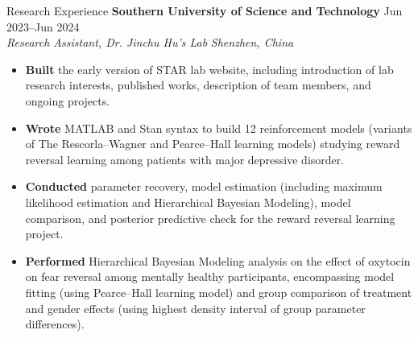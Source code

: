 \documentclass{resume} %
\begin{document}
\begin{rSection}{Research Experience}
\textbf{Southern University of Science and Technology} \hfill{Jun 2023--Jun 2024} \\
\textit{Research Assistant, Dr. Jinchu Hu’s Lab} \hfill{\textit{Shenzhen, China}}
 \begin{itemize}
    \itemsep -5pt {} 
     \item \textbf{Built} the early version of STAR lab website, including introduction of lab research interests, published works, description of team members, and ongoing projects. %
     \item \textbf{Wrote} MATLAB and Stan syntax to build 12 reinforcement models (variants of The Rescorla–Wagner and Pearce–Hall learning models) studying reward reversal learning among patients with major depressive disorder. 
     \item \textbf{Conducted} parameter recovery, model estimation (including maximum likelihood estimation and Hierarchical Bayesian Modeling), model comparison, and posterior predictive check for the reward reversal learning project. 
     \item \textbf{Performed} Hierarchical Bayesian Modeling analysis on the effect of oxytocin on fear reversal among mentally healthy participants, encompassing model fitting (using Pearce–Hall learning model) and group comparison of treatment and gender effects (using highest density interval of group parameter differences).
 \end{itemize}
 

\end{rSection}
\end{document}
